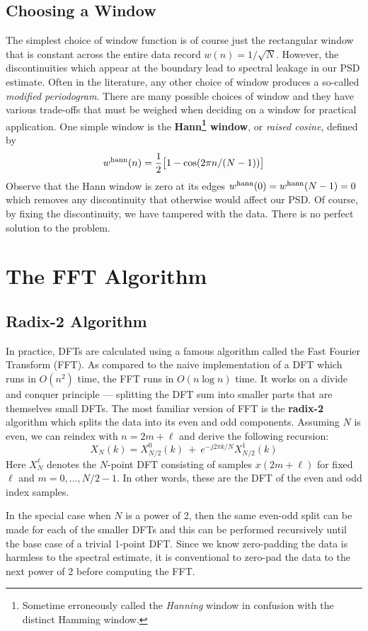 \documentclass[twocolumn]{gwclass}
\begin{document}
\subsection{Choosing a Window}
The simplest choice of window function is of course just the rectangular window that is constant across the entire data record $w(n)=1/\sqrt{N}$. However, the discontinuities which appear at the boundary lead to spectral leakage in our PSD estimate. Often in the literature, any other choice of window produces a so-called \emph{modified periodogram}. There are many possible choices of window and they have various trade-offs that must be weighed when deciding on a window for practical application. One simple window is the \textbf{Hann\footnote{Sometime erroneously called the \emph{Hanning} window in confusion with the distinct Hamming window.} window}, or \emph{raised cosine}, defined by
$$ w^{\text{\normalfont{hann}}}(n) = \frac{1}{2}\big[1 - \cos(2\pi n/(N-1))\big] $$
Observe that the Hann window is zero at its edges $w^{\text{\normalfont{hann}}}(0)=w^{\text{\normalfont{hann}}}(N-1)=0$ which removes any discontinuity that otherwise would affect our PSD. Of course, by fixing the discontinuity, we have tampered with the data. There is no perfect solution to the problem.

\section{The FFT Algorithm}
\subsection{Radix-2 Algorithm}
In practice, DFTs are calculated using a famous algorithm called the Fast Fourier Transform (FFT). As compared to the naive implementation of a DFT which runs in $O(n^2)$ time, the FFT runs in $O(n\log n)$ time. It works on a divide and conquer principle --- splitting the DFT sum into smaller parts that are themselves small DFTs. The most familiar version of FFT is the \textbf{radix-2} algorithm which splits the data into its even and odd components. Assuming $N$ is even, we can reindex with $n=2m+\ell$ and derive the following recursion:
$$ X_N(k) = X_{N/2}^{0}(k) \:+\: e^{-j2\pi k/N} X_{N/2}^1(k)$$
Here $X_N^\ell$ denotes the $N$-point DFT consisting of samples $x(2m+\ell)$ for fixed $\ell$ and $m=0,\dots,N/2-1$. In other words, these are the DFT of the even and odd index samples. 

In the special case when $N$ is a power of 2, then the same even-odd split can be made for each of the smaller DFTs and this can be performed recursively until the base case of a trivial 1-point DFT. Since we know zero-padding the data is harmless to the spectral estimate, it is conventional to zero-pad the data to the next power of 2 before computing the FFT.
\end{document}
